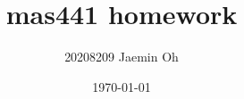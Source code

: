 \documentclass{oblivoir}
\begin{document}
\title{mas441 homework}
\author{20208209 Jaemin Oh}
\date{\today}

\maketitle

\end{document}
